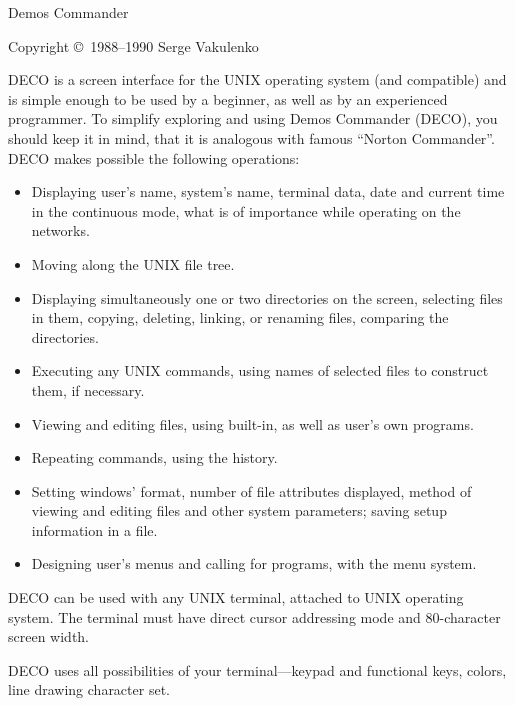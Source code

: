 
\pagestyle{empty}



\centerline{\huge\sf Demos Commander}
\vskip 6pt
\centerline{\sf Copyright \copyright\ 1988--1990 Serge Vakulenko}
\vskip 12pt

DECO is a screen interface for the UNIX operating system (and compatible)
and is simple enough to be used by a beginner, as well as by an experienced
programmer. To simplify exploring and using Demos Commander (DECO),
you should keep it in mind, that it is analogous with famous
``Norton Commander''. DECO makes possible the following
operations:
\begin{itemize}
\item
Displaying user's name, system's name, terminal data, date and current
time in the continuous mode, what is of importance while
operating on the networks.
\item
Moving along the UNIX file tree.
\item
Displaying simultaneously one or two directories on the screen,
selecting files in them, copying, deleting, linking, or renaming files,
comparing the directories.
\item
Executing any UNIX commands, using names of
selected files to construct them, if necessary.
\item
Viewing and editing files, using built-in, as well
as user's own programs.
\item
Repeating commands, using the history.
\item
Setting windows' format, number of file attributes displayed, method of
viewing and editing files and other system parameters;
saving setup information in a file.
\item
Designing user's menus and calling for programs, with the menu system.
\end{itemize}

DECO can be used with any UNIX terminal, attached to UNIX operating system.
The terminal must have direct cursor addressing mode and 80-character screen
width.

DECO uses all possibilities of your terminal---keypad and functional keys,
colors, line drawing character set.


